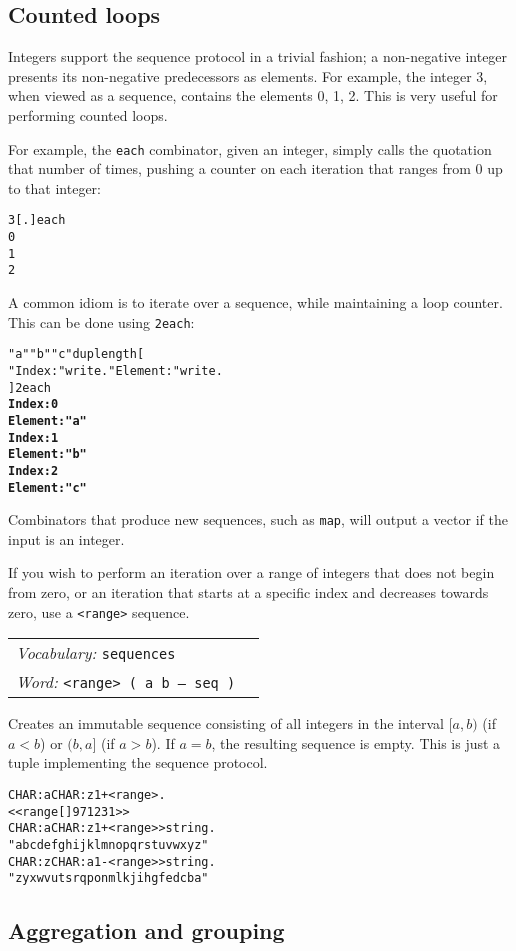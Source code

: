 \documentclass{book}
\newcommand{\tto}{\symbol{123}}
\newcommand{\ttc}{\symbol{125}}
\newcommand{\vocabulary}[1]{\emph{Vocabulary:} \texttt{#1}&\\}
\newcommand{\ordinaryword}[2]{\index{\texttt{#1}}\emph{Word:} \texttt{#2}&\\}
\newcommand{\wordtable}[1]{


\begin{tabularx}{12cm}{lX}
\hline
#1
\hline
\end{tabularx}

}
\begin{document}
\subsection{Counted loops}\label{counted-loops}

Integers support the sequence protocol in a trivial fashion; a non-negative integer presents its non-negative predecessors as elements. For example, the integer 3, when viewed as a sequence, contains the elements 0, 1, 2. This is very useful for performing counted loops.

For example, the \verb|each| combinator, given an integer, simply calls the quotation that number of times, pushing a counter on each iteration that ranges from 0 up to that integer:
\begin{alltt}
  3 [ . ] each
0
1
2
\end{alltt}
A common idiom is to iterate over a sequence, while maintaining a loop counter. This can be done using \verb|2each|:
\begin{alltt}
  \tto "a" "b" "c" \ttc dup length [
      "Index: " write . "Element: " write .
  ] 2each
\textbf{Index: 0
Element: "a"
Index: 1
Element: "b"
Index: 2
Element: "c"}
\end{alltt}
Combinators that produce new sequences, such as \verb|map|, will output a vector if the input is an integer.

If you wish to perform an iteration over a range of integers that does not begin from zero, or an iteration that starts at a specific index and decreases towards zero, use a \verb|<range>| sequence.

\wordtable{
\vocabulary{sequences}
\ordinaryword{<range>}{<range> ( a b -- seq )}
}
Creates an immutable sequence consisting of all integers in the interval $[a,b)$ (if $a<b$) or $(b,a]$ (if $a>b$). If $a=b$, the resulting sequence is empty. This is just a tuple implementing the sequence protocol.
\begin{alltt}
  CHAR: a CHAR: z 1 + <range> .
<< range [ ] 97 123 1 >>
  CHAR: a CHAR: z 1 + <range> >string .
"abcdefghijklmnopqrstuvwxyz"
  CHAR: z CHAR: a 1 - <range> >string .
"zyxwvutsrqponmlkjihgfedcba"
\end{alltt}

\subsection{Aggregation and grouping}\label{aggregation}
\end{document}
